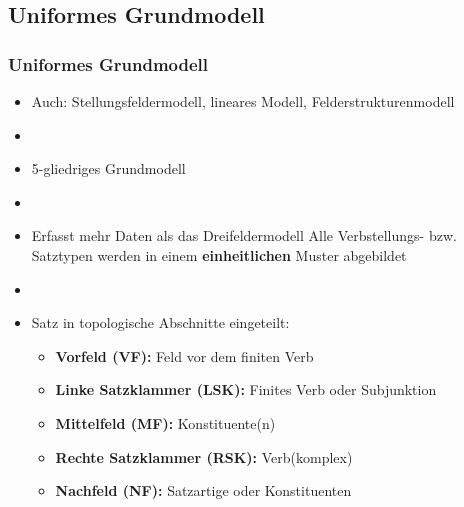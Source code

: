 \subsection{Uniformes Grundmodell}


\begin{frame}
\frametitle{Uniformes Grundmodell}

\begin{itemize}
	\item Auch: Stellungsfeldermodell,  lineares Modell, Felderstrukturenmodell 
	\item[]
	\item 5-gliedriges Grundmodell
	\item[]
	\item Erfasst mehr Daten als das Dreifeldermodell \ras Alle Verbstellungs- bzw. Satztypen werden in einem \textbf{einheitlichen} Muster abgebildet
	\item[]
	\item Satz in topologische Abschnitte eingeteilt:
	\begin{itemize}
		\item \textbf{Vorfeld (VF):} Feld vor dem finiten Verb
		\item \textbf{Linke Satzklammer (LSK):} Finites Verb oder Subjunktion
		\item \textbf{Mittelfeld (MF):} Konstituente(n)
		\item \textbf{Rechte Satzklammer (RSK):} Verb(komplex)
		\item \textbf{Nachfeld (NF):} Satzartige oder  Konstituenten
	\end{itemize}
\pause
\end{itemize}

\begin{table}
\centering
{}
\end{table}
	
\end{frame}


